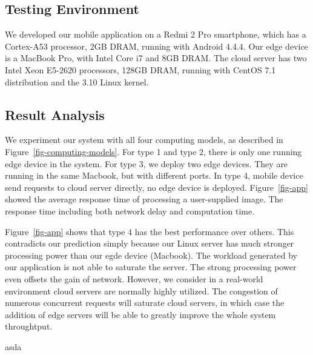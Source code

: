 \subsection{Testing Environment}
We developed our mobile application on a Redmi 2 Pro smartphone, which has a Cortex-A53 processor, 2GB DRAM,
running with Android 4.4.4.
Our edge device is a MacBook Pro, with Intel Core i7 and 8GB DRAM. The cloud server has two Intel Xeon
E5-2620 processors, 128GB DRAM, running with CentOS 7.1 distribution and the 3.10 Linux kernel.


\subsection{Result Analysis}
We experiment our system with all four computing models, as described in Figure~\ref{fig-computing-models}.
For type 1 and type 2, there is only one running edge device in the system. For type 3, we deploy two
edge devices. They are running in the same Macbook, but with different ports. In type 4, mobile device
send requests to cloud server directly, no edge device is deployed. Figure~\ref{fig-app} showed the
average response time of processing a user-supplied image. The response time including both network
delay and computation time.

Figure~\ref{fig-app} shows that type 4 has the best performance over others.
This contradicts our prediction simply because our Linux server has much stronger processing power
than our egde device (Macbook). The workload generated by our application is not able to saturate the server.
The strong processing power even offsets the gain of network. However, we consider in a real-world
environment cloud servers are normally highly utilized. The congestion of numerous concurrent
requests will saturate cloud servers, in which case the addition of edge servers will be able to
greatly improve the whole system throughtput.

asda
